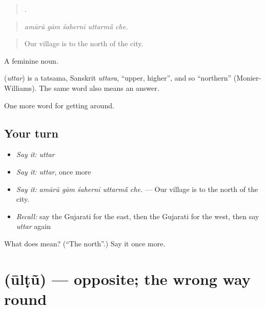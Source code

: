 \begin{quote}
    .
\end{quote}

\begin{quote}
\emph{amārũ gām śahernī uttarmā̃ che.}
\end{quote}

\begin{quote}
Our village is to the north of the city.
\end{quote}

A feminine noun.

\begin{cousinweb}
\textbf{} (\emph{uttar}) is a tatsama, Sanskrit \emph{uttara}, \textquotedblleft{}upper, higher\textquotedblright{}, and so \textquotedblleft{}northern\textquotedblright{} (Monier-Williams). The same word also means an answer.
\end{cousinweb}

\begin{grammarlens}[title={What you've built}]
One more word for getting around.
\end{grammarlens}

\subsection*{Your turn}
\begin{itemize}
\raggedright
  \item \emph{Say it:} \emph{uttar}
  \item \emph{Say it:} \emph{uttar}, once more
  \item \emph{Say it:} \emph{amārũ gām śahernī uttarmā̃ che.} — Our village is to the north of the city.
  \item \emph{Recall:} say the Gujarati for the east, then the Gujarati for the west, then say \emph{uttar} again
\end{itemize}

\begin{tcolorbox}[breakable,colback=teal!4,colframe=teal!35!black,title={Before you move on}]
What does  mean? (\textquotedblleft{}The north\textquotedblright{}.) Say it once more.
\end{tcolorbox}
\section[\texorpdfstring{\gu{ઊલટું} (ūlṭũ)}{ઊલટું (ūlṭũ)}]{ (ūlṭũ) — opposite; the wrong way round}

